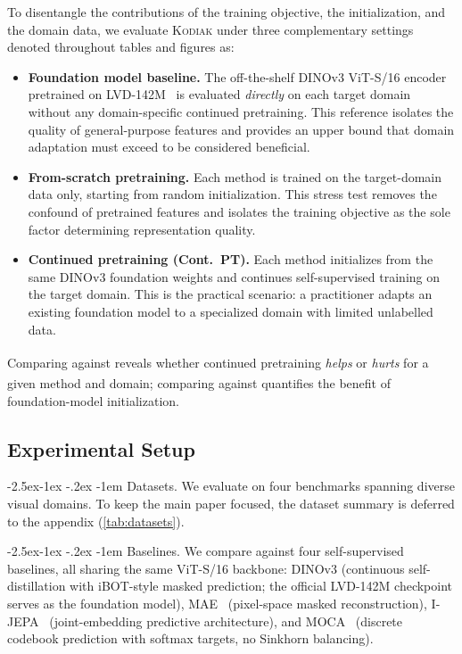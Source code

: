 \documentclass[runningheads]{llncs}
\makeatletter
\newcommand{\method}{\textsc{Kodiak}}
\newcommand{\globe}{\footnotesize{\faGlobe}\normalsize}
\newcommand{\basesym}{\globe}
\newcommand{\fsym}{\textsuperscript{\textdagger}}
\newcommand{\csym}{\textsuperscript{\textdaggerdbl}}
\renewcommand\paragraph{\@startsection{paragraph}{4}{\z@}%
  {-2.5ex\@plus -1ex \@minus -.2ex}%
  {-1em}%
  {\normalfont\normalsize\bfseries}}
\makeatother
\begin{document}
To disentangle the contributions of the training objective, the initialization, and the domain data, we evaluate \method{} under three complementary settings denoted throughout tables and figures as:
\begin{itemize}[nosep,leftmargin=*]
    \item[\basesym{}] \textbf{Foundation model baseline.}
    The off-the-shelf DINOv3 ViT-S/16 encoder pretrained on LVD-142M~\cite{oquab2024dinov2} is evaluated \emph{directly} on each target domain without any domain-specific continued pretraining.
    This reference isolates the quality of general-purpose features and provides an upper bound that domain adaptation must exceed to be considered beneficial.
    \item[\fsym{}] \textbf{From-scratch pretraining.}
    Each method is trained on the target-domain data only, starting from random initialization.
    This stress test removes the confound of pretrained features and isolates the training objective as the sole factor determining representation quality.
    \item[\csym{}] \textbf{Continued pretraining (Cont.~PT).}
    Each method initializes from the same DINOv3 foundation weights and continues self-supervised training on the target domain.
    This is the practical scenario: a practitioner adapts an existing foundation model to a specialized domain with limited unlabelled data.
\end{itemize}
Comparing \basesym{} against \csym{} reveals whether continued pretraining \emph{helps} or \emph{hurts} for a given method and domain; comparing \fsym{} against \csym{} quantifies the benefit of foundation-model initialization.

\subsection{Experimental Setup}
\label{sec:setup}

\paragraph{Datasets.}
We evaluate on four benchmarks spanning diverse visual domains.
To keep the main paper focused, the dataset summary is deferred to the appendix (\cref{tab:datasets}).

\paragraph{Baselines.}
We compare against four self-supervised baselines, all sharing the same ViT-S/16 backbone:
DINOv3 (continuous self-distillation with iBOT-style masked prediction; the official LVD-142M checkpoint serves as the foundation model),
MAE~\cite{he2022masked} (pixel-space masked reconstruction),
I-JEPA~\cite{assran2023self} (joint-embedding predictive architecture),
and MOCA~\cite{gidaris2024moca} (discrete codebook prediction with softmax targets, no Sinkhorn balancing).
\end{document}
